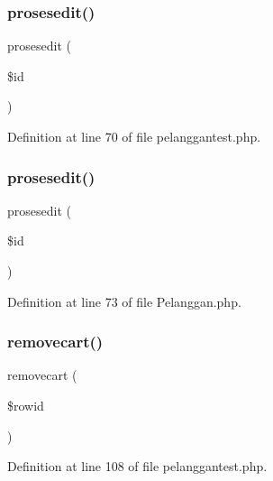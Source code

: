 \subsubsection{\texorpdfstring{prosesedit()}{prosesedit()}\hspace{0.1cm}{\footnotesize\ttfamily [1/2]}}
{\footnotesize\ttfamily prosesedit (\begin{DoxyParamCaption}\item[{}]{\$id }\end{DoxyParamCaption})}



Definition at line 70 of file pelanggantest.\+php.

\mbox{\label{class_pelanggan_a580c41d234a611e73e56a65f5c5f3e48}} 
\subsubsection{\texorpdfstring{prosesedit()}{prosesedit()}\hspace{0.1cm}{\footnotesize\ttfamily [2/2]}}
{\footnotesize\ttfamily prosesedit (\begin{DoxyParamCaption}\item[{}]{\$id }\end{DoxyParamCaption})}



Definition at line 73 of file Pelanggan.\+php.

\mbox{\label{class_pelanggan_a1b9dd472c16e5d04be01be8032bd7ffa}} 
\subsubsection{\texorpdfstring{removecart()}{removecart()}\hspace{0.1cm}{\footnotesize\ttfamily [1/2]}}
{\footnotesize\ttfamily removecart (\begin{DoxyParamCaption}\item[{}]{\$rowid }\end{DoxyParamCaption})}



Definition at line 108 of file pelanggantest.\+php.

\mbox{\label{class_pelanggan_a1b9dd472c16e5d04be01be8032bd7ffa}} 
